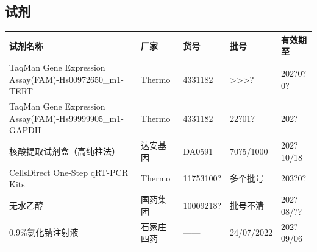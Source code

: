 \documentclass[UTF8,10pt,a4paper,fontset=fandol]{ctexart}
\newcommand{\fieldvalue}[1]{#1}
\newcommand{\handwritten}[1]{#1}
\begin{document}
\subsection{试剂}

\begin{center}
\small
\begin{tabular}{|p{5.2cm}|p{2.6cm}|p{2.7cm}|p{3.0cm}|p{2.8cm}|}
\hline
试剂名称 & 厂家 & 货号 & 批号 & 有效期至\\
\hline
TaqMan Gene Expression Assay(FAM)-Hs00972650\_m1-TERT
& Thermo & 4331182 &
\fieldvalue{\handwritten{>>>?}}
&
\fieldvalue{\handwritten{202?0?0?}}
\\
\hline
TaqMan Gene Expression Assay(FAM)-Hs99999905\_m1-GAPDH
& Thermo & 4331182 &
\fieldvalue{\handwritten{22?01?}}
&
\fieldvalue{\handwritten{202?}}
\\
\hline
核酸提取试剂盒（高纯柱法）
& 达安基因 & DA0591 &
\fieldvalue{\handwritten{70?5/1000}}
&
\fieldvalue{\handwritten{202?10/18}}
\\
\hline
CellsDirect One-Step qRT-PCR Kits
& Thermo & 11753100? &
\fieldvalue{\handwritten{多个批号}}
&
\fieldvalue{\handwritten{203?0?}}
\\
\hline
无水乙醇 & 国药集团 & 10009218? &
\fieldvalue{\handwritten{批号不清}}
&
\fieldvalue{\handwritten{202?08/??}}
\\
\hline
0.9\%氯化钠注射液 & 石家庄四药 & —— &
\fieldvalue{\handwritten{24/07/2022}}
&
\fieldvalue{\handwritten{202?09/06}}
\\
\hline
\end{tabular}
\end{center}
\end{document}
